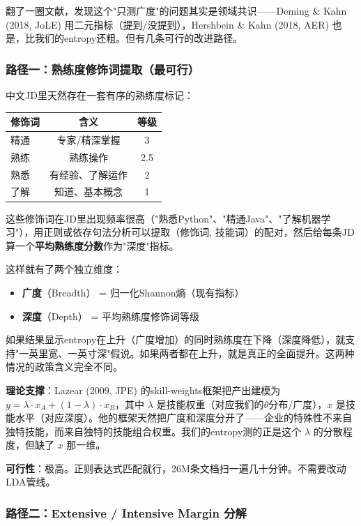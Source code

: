 \documentclass[12pt,a4paper]{ctexart}
\begin{document}
翻了一圈文献，发现这个"只测广度"的问题其实是领域共识——Deming \& Kahn (2018, JoLE) 用二元指标（提到/没提到），Hershbein \& Kahn (2018, AER) 也是，比我们的entropy还粗。但有几条可行的改进路径。

\subsubsection{路径一：熟练度修饰词提取（最可行）}

中文JD里天然存在一套有序的熟练度标记：

\begin{table}[h]
\centering
\begin{tabular}{lcc}
\toprule
\textbf{修饰词} & \textbf{含义} & \textbf{等级} \\
\midrule
精通 & 专家/精深掌握 & 3 \\
熟练 & 熟练操作 & 2.5 \\
熟悉 & 有经验、了解运作 & 2 \\
了解 & 知道、基本概念 & 1 \\
\bottomrule
\end{tabular}
\end{table}

这些修饰词在JD里出现频率很高（"熟悉Python"、"精通Java"、"了解机器学习"），用正则或依存句法分析可以提取（修饰词, 技能词）的配对，然后给每条JD算一个\textbf{平均熟练度分数}作为"深度"指标。

这样就有了两个独立维度：
\begin{itemize}
\item \textbf{广度}（Breadth） = 归一化Shannon熵（现有指标）
\item \textbf{深度}（Depth） = 平均熟练度修饰词等级
\end{itemize}

如果结果显示entropy在上升（广度增加）的同时熟练度在下降（深度降低），就支持"一英里宽、一英寸深"假说。如果两者都在上升，就是真正的全面提升。这两种情况的政策含义完全不同。

\textbf{理论支撑}：Lazear (2009, JPE) 的skill-weights框架把产出建模为 $y = \lambda \cdot x_A + (1-\lambda) \cdot x_B$，其中 $\lambda$ 是技能权重（对应我们的$\theta$分布/广度），$x$ 是技能水平（对应深度）。他的框架天然把广度和深度分开了——企业的特殊性不来自独特技能，而来自独特的技能组合权重。我们的entropy测的正是这个 $\lambda$ 的分散程度，但缺了 $x$ 那一维。

\textbf{可行性}：极高。正则表达式匹配就行，26M条文档扫一遍几十分钟。不需要改动LDA管线。

\subsubsection{路径二：Extensive / Intensive Margin 分解}
\end{document}

